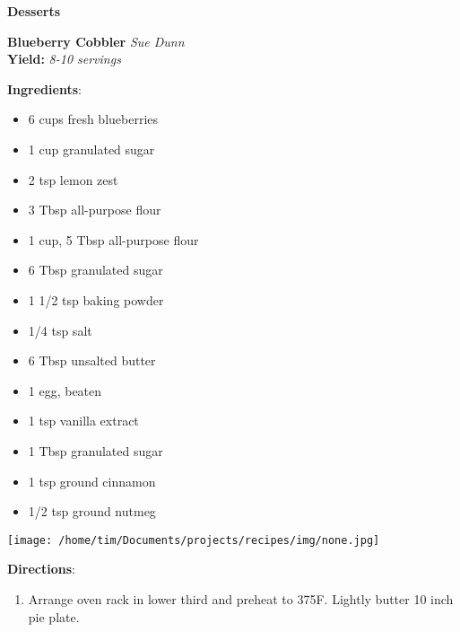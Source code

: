 \documentclass[11pt, twoside, openany]{book}
\begin{document}
{\newpage \LARGE \textbf{Desserts}} \label{desserts}\vspace{4mm}\\
\noindent\begin{minipage}[t]{\linewidth}%
{\Large\textbf{Blueberry Cobbler}} \label{blueberry-cobbler}\hfill\textit{Sue Dunn}\\
\textbf{Yield:} \textit{8-10 servings}\\
\noindent\begin{minipage}[t]{0.78\linewidth}%
\textbf{Ingredients}:\vspace{-3mm}
\begin{multicols}{2}
\begin{itemize}\setlength\itemsep{-1mm}
\item 6 cups fresh blueberries
\item 1 cup granulated sugar
\item 2 tsp lemon zest
\item 3 Tbsp all-purpose flour
\item 1 cup, 5 Tbsp all-purpose flour
\item 6 Tbsp granulated sugar
\item 1 1/2 tsp baking powder
\item 1/4 tsp salt
\item 6 Tbsp unsalted butter
\item 1 egg, beaten
\item 1 tsp vanilla extract
\item 1 Tbsp granulated sugar
\item 1 tsp ground cinnamon
\item 1/2 tsp ground nutmeg
\end{itemize}
\end{multicols}
\end{minipage}
\noindent\begin{minipage}[t]{0.18\linewidth}
\centering \strut\vspace*{-\baselineskip}\newline
\texttt{[image: /home/tim/Documents/projects/recipes/img/none.jpg]}\\
\end{minipage}\vspace{3mm}
\textbf{Directions}:
\vspace{-3mm}\begin{enumerate}\setlength\itemsep{-1mm}
\item Arrange oven rack in lower third and preheat to 375F. Lightly butter 10 inch pie plate.

\end{enumerate}
\end{minipage}
\end{document}
